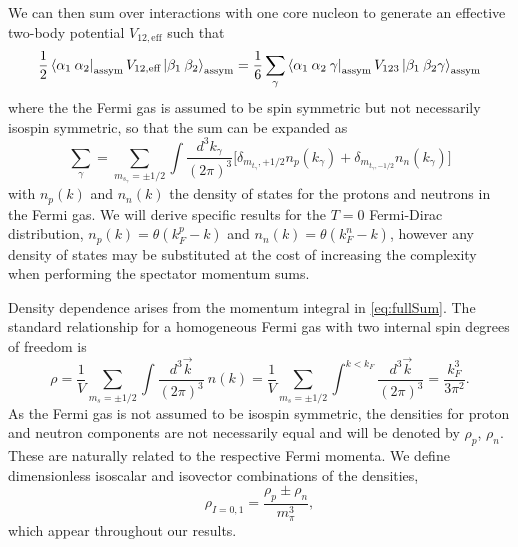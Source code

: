 We can then sum over interactions with one core nucleon to generate an effective two-body potential $V_{12,\text{eff}}$ such that
\begin{equation}
\frac{1}{2} \bra{\alpha_1\:\alpha_2}_{\text{assym}}  V_{12,\text{eff}}\ket{\beta_1 \:\beta_2 }_{\text{assym}}=\frac{1}{6} \sum_{\gamma} \bra{\alpha_1\:\alpha_2 \: \gamma}_{\text{assym}} V_{123}  \ket{\beta_1 \:\beta_2 \gamma}_{\text{assym}}
\end{equation}
where the the Fermi gas is assumed to be spin symmetric but not necessarily isospin symmetric, so that the sum can be expanded as
\begin{equation}\label{eq:fullSum}
\sum_\gamma=\sum_{m_{s_\gamma}=\pm 1/2}\int \frac{d^3k_\gamma}{(2\pi)^3} \Big[\delta_{m_{t_\gamma},+1/2} n_p(k_\gamma) +\delta_{m_{t_\gamma,-1/2}} n_n(k_\gamma) \Big]
\end{equation}
with $n_p(k)$ and $n_n(k)$ the density of states for the protons and neutrons in the Fermi gas. We will derive specific results for the $T=0$ Fermi-Dirac distribution, $n_p(k)=\theta(k_{F}^{p}-k)$ and $n_n(k)=\theta(k_{F}^{n}-k)$, however any density of states may be substituted at the cost of increasing the complexity when performing the spectator momentum sums.

Density dependence arises from the momentum integral in \eqref{eq:fullSum}. The standard relationship for a homogeneous Fermi gas with two internal spin degrees of freedom is 
\begin{equation}\label{eq:kF}
\rho=\frac{1}{V}\sum_{m_{s}=\pm 1/2}\int \frac{d^3\vec{k}}{(2\pi)^3}\:n(k)
=\frac{1}{V}\sum_{m_{s}=\pm 1/2}\int^{k<k_F}\frac{d^3\vec{k}}{(2\pi)^3}=\frac{k_F^3}{3\pi^2}.
\end{equation}
As the Fermi gas is not assumed to be isospin symmetric, the densities for proton and neutron components are not necessarily equal and will be denoted by $\rho_p$, $\rho_n$. These are naturally related to the respective Fermi momenta. We define dimensionless isoscalar and isovector combinations of the densities, 
\begin{equation}\label{eq:densities}
\rho_{I=0,1}=\frac{\rho_p\pm\rho_n}{m_\pi^3},
\end{equation}
which appear throughout our results.

